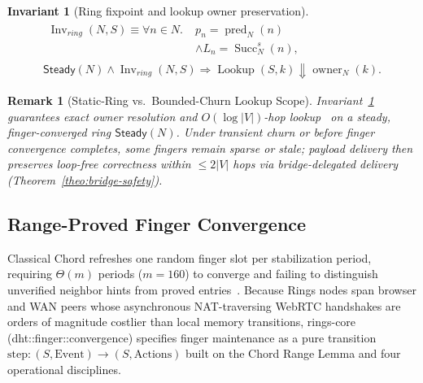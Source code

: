 \documentclass[journal]{IEEEtran}
\newtheorem{invariant}{Invariant}
\newtheorem{remark}{Remark}
\DeclareRobustCommand{\code}[1]{{\ttfamily\renewcommand{\_}{\textunderscore\allowbreak}#1}}
\begin{document}
\begin{invariant}[Ring fixpoint and lookup owner preservation]\label{inv:ring-fixpoint}
\[
\begin{gathered}
  \begin{aligned}
    \operatorname{Inv}_{ring}(N,S) \equiv \forall n\in N.\;&
    p_n=\operatorname{pred}_N(n)\\
    &\land L_n=\operatorname{Succ}^s_N(n),
  \end{aligned}\\[2pt]
  \mathsf{Steady}(N)\land\operatorname{Inv}_{ring}(N,S)
  \Rightarrow
  \operatorname{Lookup}(S,k)\Downarrow
  \operatorname{owner}_N(k).
\end{gathered}
\]
\end{invariant}

\begin{remark}[Static-Ring vs.\ Bounded-Churn Lookup Scope]
Invariant~\ref{inv:ring-fixpoint} guarantees exact owner resolution and $O(\log |V|)$-hop lookup~\cite{Chord,Stoica2003,ZaveChordCorrect} on a steady, finger-converged ring $\mathsf{Steady}(N)$. Under transient churn or before finger convergence completes, some fingers remain sparse or stale; payload delivery then preserves loop-free correctness within $\le 2|V|$ hops via bridge-delegated delivery (Theorem~\ref{theo:bridge-safety}).
\end{remark}

\subsection{Range-Proved Finger Convergence}\label{sec:finger-convergence}

Classical Chord refreshes one random finger slot per stabilization period,
requiring $\Theta(m)$ periods ($m=160$) to converge and failing to distinguish
unverified neighbor hints from proved entries~\cite{Stoica2003}.  Because
Rings nodes span browser and WAN peers whose asynchronous NAT-traversing WebRTC
handshakes are orders of magnitude costlier than local memory transitions,
\code{rings-core} (\code{dht::finger::convergence}) specifies finger maintenance as
a pure transition $\mathrm{step}:(S,\mathrm{Event})\to(S,\mathrm{Actions})$
built on the Chord Range Lemma and four operational disciplines.
\end{document}
